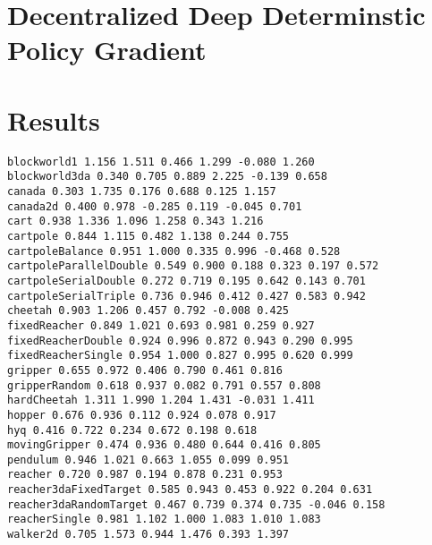 \documentclass{article} %
\numberwithin{equation}{subsection}
\numberwithin{theorem}{subsection}
\begin{document}



\section{Decentralized Deep Determinstic Policy Gradient}





\section{Results}
\begin{verbatim}
blockworld1 1.156 1.511 0.466 1.299 -0.080 1.260
blockworld3da 0.340 0.705 0.889 2.225 -0.139 0.658
canada 0.303 1.735 0.176 0.688 0.125 1.157
canada2d 0.400 0.978 -0.285 0.119 -0.045 0.701
cart 0.938 1.336 1.096 1.258 0.343 1.216
cartpole 0.844 1.115 0.482 1.138 0.244 0.755
cartpoleBalance 0.951 1.000 0.335 0.996 -0.468 0.528
cartpoleParallelDouble 0.549 0.900 0.188 0.323 0.197 0.572
cartpoleSerialDouble 0.272 0.719 0.195 0.642 0.143 0.701
cartpoleSerialTriple 0.736 0.946 0.412 0.427 0.583 0.942
cheetah 0.903 1.206 0.457 0.792 -0.008 0.425
fixedReacher 0.849 1.021 0.693 0.981 0.259 0.927
fixedReacherDouble 0.924 0.996 0.872 0.943 0.290 0.995
fixedReacherSingle 0.954 1.000 0.827 0.995 0.620 0.999
gripper 0.655 0.972 0.406 0.790 0.461 0.816
gripperRandom 0.618 0.937 0.082 0.791 0.557 0.808
hardCheetah 1.311 1.990 1.204 1.431 -0.031 1.411
hopper 0.676 0.936 0.112 0.924 0.078 0.917
hyq 0.416 0.722 0.234 0.672 0.198 0.618
movingGripper 0.474 0.936 0.480 0.644 0.416 0.805
pendulum 0.946 1.021 0.663 1.055 0.099 0.951
reacher 0.720 0.987 0.194 0.878 0.231 0.953
reacher3daFixedTarget 0.585 0.943 0.453 0.922 0.204 0.631
reacher3daRandomTarget 0.467 0.739 0.374 0.735 -0.046 0.158
reacherSingle 0.981 1.102 1.000 1.083 1.010 1.083
walker2d 0.705 1.573 0.944 1.476 0.393 1.397
\end{verbatim}
\end{document}
